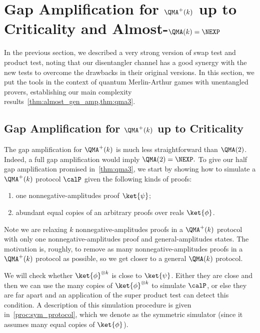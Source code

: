 \section{Gap Amplification for $\QMA^+(k)$ up to Criticality and Almost-$\QMA(k)=\NEXP$}\label{sec:protocol}

In the previous section, we described a very strong version of swap test and product test, noting that our disentangler channel has a good synergy with the new tests to overcome the drawbacks in their original versions.
%
In this section, we put the tools in the context of quantum Merlin-Arthur games with unentangled provers,
establishing our main complexity results~\cref{thm:almost_gen_amp,thm:qma3}.

\subsection{Gap Amplification for $\QMA^+(k)$ up to Criticality}

The gap amplification for $\QMA^+(k)$ is much less straightforward than $\QMA(2)$.
%
Indeed, a full gap amplification would imply $\QMA(2) = \NEXP.$
%
To give our half gap amplification promised in~\cref{thm:qma3}, we start by showing how to
simulate a $\QMA^+(k)$ protocol $\calP$ given the following kinds of proofs:
\begin{enumerate}
    \item\label{enu:nonnegative-state} one nonnegative-amplitudes proof $\ket{\psi}$;
    \item\label{enu:many-general-states} abundant equal copies of an arbitrary proofs over reals $\ket{\phi}$.
\end{enumerate}   
Note we are relaxing $k$ nonnegative-amplitudes proofs in a $\QMA^+(k)$ protocol with only one nonnegative-amplitudes
proof and general-amplitudes states.
%
The motivation is, roughly, to remove as many nonnegative-amplitudes proofs in a $\QMA^+(k)$ protocol as possible, so we get
closer to a general $\QMA(k)$ protocol. 

We will check whether  $\ket{\phi}^{\otimes k}$
is close to $\ket{\psi}$. Either they are close and then we can use the many copies of $\ket{\phi}^{\otimes k}$
to simulate $\calP$, or else they are far apart and an application of the super product test can detect this
condition. A description of this simulation procedure is given in~\cref{proc:sym_protocol}, which we denote
as the symmetric simulator (since it assumes many equal copies of $\ket{\phi}$).


